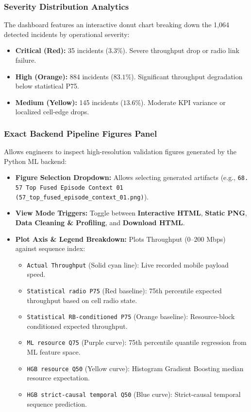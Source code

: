 \documentclass[12pt,a4paper]{article}
\begin{document}
\subsubsection{Severity Distribution Analytics}
The dashboard features an interactive donut chart breaking down the 1,064 detected incidents by operational severity:
\begin{itemize}
    \item \textbf{Critical (Red):} 35 incidents ($3.3\%$). Severe throughput drop or radio link failure.
    \item \textbf{High (Orange):} 884 incidents ($83.1\%$). Significant throughput degradation below statistical P75.
    \item \textbf{Medium (Yellow):} 145 incidents ($13.6\%$). Moderate KPI variance or localized cell-edge drops.
\end{itemize}

\subsubsection{Exact Backend Pipeline Figures Panel}
Allows engineers to inspect high-resolution validation figures generated by the Python ML backend:
\begin{itemize}
    \item \textbf{Figure Selection Dropdown:} Allows selecting generated artifacts (e.g., \texttt{68. 57 Top Fused Episode Context 01 (57\_top\_fused\_episode\_context\_01.png)}).
    \item \textbf{View Mode Triggers:} Toggle between \textbf{Interactive HTML}, \textbf{Static PNG}, \textbf{Data Cleaning \& Profiling}, and \textbf{Download HTML}.
    \item \textbf{Plot Axis \& Legend Breakdown:} Plots Throughput ($0$--$200$ Mbps) against sequence index:
    \begin{itemize}
        \item \texttt{Actual Throughput} (Solid cyan line): Live recorded mobile payload speed.
        \item \texttt{Statistical radio P75} (Red baseline): 75th percentile expected throughput based on cell radio state.
        \item \texttt{Statistical RB-conditioned P75} (Orange baseline): Resource-block conditioned expected throughput.
        \item \texttt{ML resource Q75} (Purple curve): 75th percentile quantile regression from ML feature space.
        \item \texttt{HGB resource Q50} (Yellow curve): Histogram Gradient Boosting median resource expectation.
        \item \texttt{HGB strict-causal temporal Q50} (Blue curve): Strict-causal temporal sequence prediction.
    \end{itemize}
\end{itemize}
\end{document}

